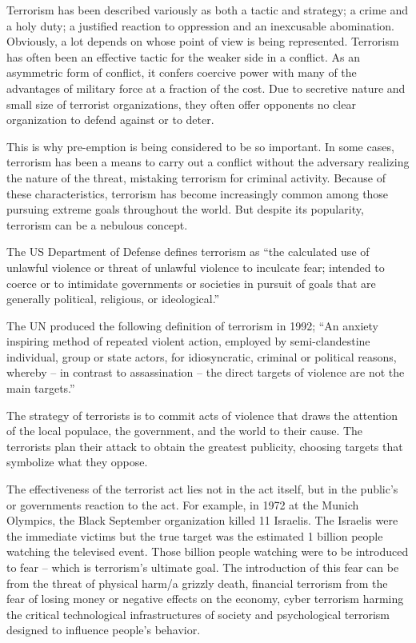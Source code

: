 \documentclass[
  openany]{book}
\begin{document}
Terrorism has been described variously as both a tactic and strategy; a crime and a holy duty; a justified reaction to oppression and an inexcusable abomination. Obviously, a lot depends on whose point of view is being represented. Terrorism has often been an effective tactic for the weaker side in a conflict. As an asymmetric form of conflict, it confers coercive power with many of the advantages of military force at a fraction of the cost. Due to secretive nature and small size of terrorist organizations, they often offer opponents no clear organization to defend against or to deter.

This is why pre-emption is being considered to be so important. In some cases, terrorism has been a means to carry out a conflict without the adversary realizing the nature of the threat, mistaking terrorism for criminal activity. Because of these characteristics, terrorism has become increasingly common among those pursuing extreme goals throughout the world. But despite its popularity, terrorism can be a nebulous concept.

The US Department of Defense defines terrorism as ``the calculated use of unlawful violence or threat of unlawful violence to inculcate fear; intended to coerce or to intimidate governments or societies in pursuit of goals that are generally political, religious, or ideological.''

The UN produced the following definition of terrorism in 1992; ``An anxiety inspiring method of repeated violent action, employed by semi-clandestine individual, group or state actors, for idiosyncratic, criminal or political reasons, whereby -- in contrast to assassination -- the direct targets of violence are not the main targets.''

The strategy of terrorists is to commit acts of violence that draws the attention of the local populace, the government, and the world to their cause. The terrorists plan their attack to obtain the greatest publicity, choosing targets that symbolize what they oppose.

The effectiveness of the terrorist act lies not in the act itself, but in the public's or governments reaction to the act. For example, in 1972 at the Munich Olympics, the Black September organization killed 11 Israelis. The Israelis were the immediate victims but the true target was the estimated 1 billion people watching the televised event. Those billion people watching were to be introduced to fear -- which is terrorism's ultimate goal. The introduction of this fear can be from the threat of physical harm/a grizzly death, financial terrorism from the fear of losing money or negative effects on the economy, cyber terrorism harming the critical technological infrastructures of society and psychological terrorism designed to influence people's behavior.
\end{document}
